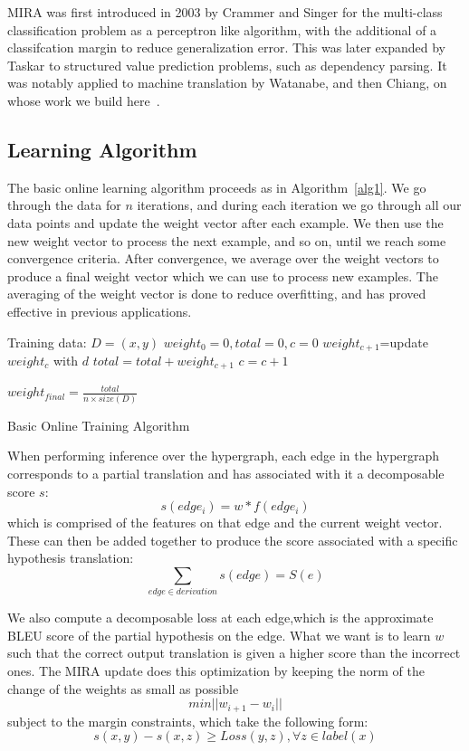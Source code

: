 MIRA was first introduced in 2003 by Crammer and Singer for the multi-class classification problem as a perceptron like algorithm, with the additional of a classifcation margin to reduce generalization error. This was later expanded by Taskar to structured value prediction problems, such as dependency parsing. It was notably applied to machine translation by Watanabe, and then Chiang, on whose work we build here~\cite{watanabe:07,chiang:2009:naacl}.

\subsection{Learning Algorithm}
The basic online learning algorithm proceeds as in Algorithm~\ref{alg1}. We go through the data for $n$ iterations, and during each iteration we go through all our data points and update the weight vector after each example. We then use the new weight vector to process the next example, and so on, until we reach some convergence criteria. After convergence, we average over the weight vectors to produce a final weight vector which we can use to process new examples. The averaging of the weight vector is done to reduce overfitting, and has proved effective in previous applications. 

\begin{algorithm}
\begin{algorithmic}
\STATE Training data: $D=(x,y)$
\STATE $weight_0=0, total=0, c=0$
  \STATE $weight_{c+1}$=update $weight_c$ with $d$
  \STATE $total=total+weight_{c+1}$
  \STATE $c=c+1$
\ENDFOR
\ENDFOR

\STATE $weight_{final} = \frac{total}{n \times size(D)}$
\end{algorithmic}
\caption{Basic Online Training Algorithm}
\label{alg1}

\end{algorithm}

When performing inference over the hypergraph, each edge in the hypergraph corresponds to a partial translation and has associated with it a decomposable score $s$:
$$s(edge_i) = w*f(edge_i)$$
which is comprised of the features on that edge and the current weight vector. These can then be added together to produce the score associated with a specific hypothesis translation:
$$\sum_{edge \in derivation} s(edge)= S(e) $$

We also compute a decomposable loss at each edge,which is the approximate BLEU score of the partial hypothesis on the edge. 
What we want is to learn $w$ such that the correct output translation is given a higher score than the incorrect ones. The MIRA update does this optimization by keeping the norm of the change of the weights as small as possible
$$ min ||w_{i+1} - w_i||$$
subject to the margin constraints, which take the following form:
$$ s(x,y) - s(x,z) \geq Loss(y,z), \forall{z} \in label(x)$$

